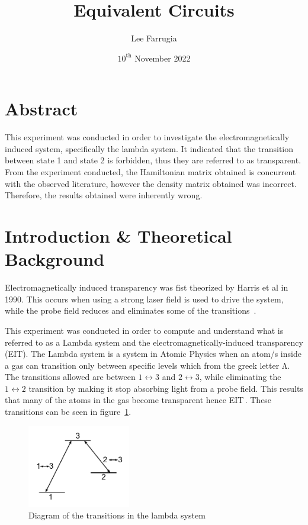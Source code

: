 \documentclass[12pt, a4paper]{article}
\title{Equivalent Circuits}
\date{\(10^\mathrm{{th}}\) November 2022}
\author{Lee Farrugia}
\begin{document}
\maketitle
\thispagestyle{titlepagestyle}
\pagestyle{mystyle}

\section*{Abstract}
This experiment was conducted in order to investigate the electromagnetically induced system, specifically the lambda system. It indicated that the transition between state 1 and state 2 is forbidden, thus they are referred to as transparent. From the experiment conducted, the Hamiltonian matrix obtained is concurrent with the observed literature, however the density matrix obtained was incorrect. Therefore, the results obtained were inherently wrong.

\section{Introduction \& Theoretical Background}
Electromagnetically induced transparency was fist theorized by Harris et al in 1990. This occurs when using a strong laser field is used to drive the system, while the probe field reduces and eliminates some of the transitions~\parencite{ijazEIT}.

This experiment was conducted in order to compute and understand what is referred to as a Lambda system and the electromagnetically-induced transparency (EIT). The Lambda system is a system in Atomic Physics when an atom/s inside a gas can transition only between specific levels which from the greek letter \(\mathrm{\Lambda}\). The transitions allowed are between \(1 \leftrightarrow 3\) and \(2 \leftrightarrow 3\), while eliminating the \(1 \leftrightarrow 2\) transition by making it stop absorbing light from a probe field. This results that many of the atoms in the gas become transparent hence EIT\,. These transitions can be seen in figure~\ref{fig:Transition_Diagram}.

\begin{figure}[H]
  \centering
  \includegraphics[width=0.4\textwidth]{Transition Diagram.png}\caption{Diagram of the transitions in the lambda system}\label{fig:Transition_Diagram}
\end{figure}
\end{document}
